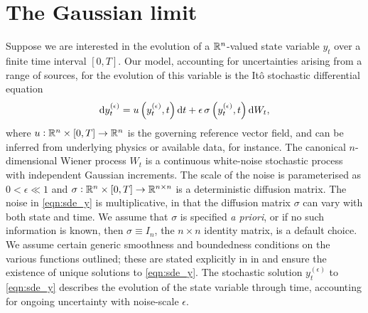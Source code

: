 \section{The Gaussian limit}\label{sec:theory}
Suppose we are interested in the evolution of a \(\mathbb{R}^n\)-valued state variable $ y_t $ over a finite time interval \([0,T]\). 
Our model, accounting for uncertainties arising from a range of sources, for the evolution of this variable is the It\^o stochastic differential equation 
\begin{equation}
	\dif y_t^{(\epsilon)} = u\left(y_t^{(\epsilon)}, t\right)\dif t + \epsilon \, \sigma\left(y_t^{(\epsilon)}, t\right)\dif W_t,
	\label{eqn:sde_y}
\end{equation}
where \(u: \mathbb{R}^n \times [0,T] \to \mathbb{R}^n\) is the governing reference vector field, and can be inferred from underlying physics or available data, for instance.  
The canonical \(n\)-dimensional Wiener process \(W_t\)  is a continuous white-noise stochastic process with independent Gaussian increments.
The scale of the noise is parameterised as \(0 < \epsilon \ll 1\) and \(\sigma: \mathbb{R}^n \times [0,T] \to \mathbb{R}^{n\times n}\) is a deterministic diffusion matrix.  
The noise in \eqref{eqn:sde_y} is multiplicative, in that the diffusion matrix \(\sigma\) can vary with both state and time.
We assume that \(\sigma\) is specified \textit{a priori}, or if no such information is known, then \(\sigma \equiv I_n\), the \(n \times n\) identity matrix, is a default choice.
We assume certain generic smoothness and boundedness conditions on the various functions outlined; these are stated explicitly in  in  and ensure the existence of unique solutions to \eqref{eqn:sde_y}. 
The stochastic solution \(y_t^{(\epsilon)}\) to \eqref{eqn:sde_y} describes the evolution of the state variable through time, accounting for ongoing uncertainty with noise-scale \(\epsilon\).

